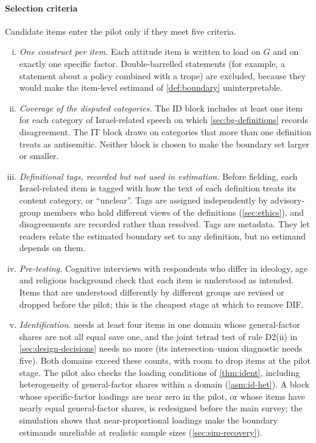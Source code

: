 \paragraph{Selection criteria}
Candidate items enter the pilot only if they meet five criteria.
\begin{enumerate}[(i)]
  \item \emph{One construct per item.} Each attitude item is written to load on $G$ and on exactly one specific factor. Double-barrelled statements (for example, a statement about a policy combined with a trope) are excluded, because they would make the item-level estimand of \cref{def:boundary} uninterpretable.
  \item \emph{Coverage of the disputed categories.} The ID block includes at least one item for each category of Israel-related speech on which \cref{sec:bg-definitions} records disagreement. The IT block draws on categories that more than one definition treats as antisemitic. Neither block is chosen to make the boundary set larger or smaller.
  \item \emph{Definitional tags, recorded but not used in estimation.} Before fielding, each Israel-related item is tagged with how the text of each definition treats its content category, or ``unclear''. Tags are assigned independently by advisory-group members who hold different views of the definitions (\cref{sec:ethics}), and disagreements are recorded rather than resolved. Tags are metadata. They let readers relate the estimated boundary set to any definition, but no estimand depends on them.
  \item \emph{Pre-testing.} Cognitive interviews with respondents who differ in ideology, age and religious background check that each item is understood as intended. Items that are understood differently by different groups are revised or dropped before the pilot; this is the cheapest stage at which to remove DIF.
  \item \emph{Identification.}  needs at least four items in one domain whose general-factor shares are not all equal save one, and the joint tetrad test of rule D2(ii) in \cref{sec:design-decisions} needs no more (its intersection--union diagnostic needs five). Both domains exceed these counts, with room to drop items at the pilot stage. The pilot also checks the loading conditions of \cref{thm:ident}, including heterogeneity of general-factor shares within a domain (\cref{asm:id-het}). A block whose specific-factor loadings are near zero in the pilot, or whose items have nearly equal general-factor shares, is redesigned before the main survey; the simulation shows that near-proportional loadings make the boundary estimands unreliable at realistic sample sizes (\cref{sec:sim-recovery}).
\end{enumerate}

